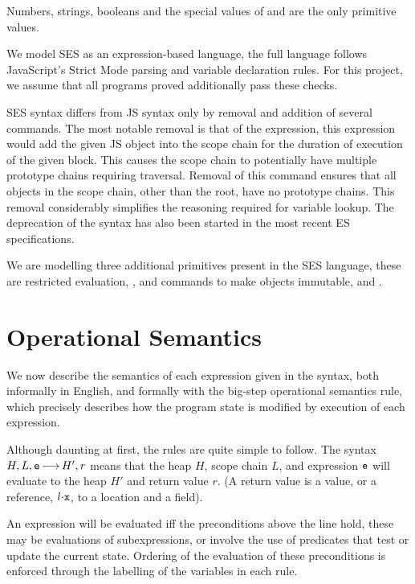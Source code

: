 \documentclass[a4paper,notitlepage]{report}
\begin{document}
  Numbers, strings, booleans and the special values of \und and \nil are the
  only primitive values.

  We model SES as an expression-based language, the full language follows
  JavaScript's Strict Mode parsing and variable declaration rules. For this
  project, we assume that all programs proved additionally pass these checks.

  SES syntax differs from JS syntax only by removal and addition of several
  commands. The most notable removal is that of the  expression, this
  expression would add the given JS object into the scope chain for the duration
  of execution of the given block. This causes the scope chain to potentially
  have multiple prototype chains requiring traversal. Removal of this command
  ensures that all objects in the scope chain, other than the root, have no
  prototype chains. This removal considerably simplifies the reasoning required
  for variable lookup. The deprecation of the  syntax has also been
  started in the most recent ES specifications.

  We are modelling three additional primitives present in the SES language,
  these are restricted evaluation, , and commands to make objects
  immutable,  and .


  \section{Operational Semantics}
  \label{sec:opsems}

  We now describe the semantics of each expression given in the syntax, both
  informally in English, and formally with the big-step operational semantics
  rule, which precisely describes how the program state is modified by execution
  of each expression.

  Although daunting at first, the rules are quite simple to follow. The syntax
  $H,L,\mathtt{e} {\,\longrightarrow\,} H',r$ means that the heap $H$, scope chain $L$, and
  expression $\mathtt{e}$ will evaluate to the heap $H'$ and return value $r$. (A
  return value is a value, or a reference, $\fld{l}{\js{x}}$, to a location and
  a field).

  An expression will be evaluated iff the preconditions above the line hold,
  these may be evaluations of subexpressions, or involve the use of predicates
  that test or update the current state.
  Ordering of the evaluation of these preconditions is enforced through the
  labelling of the variables in each rule.
\end{document}
